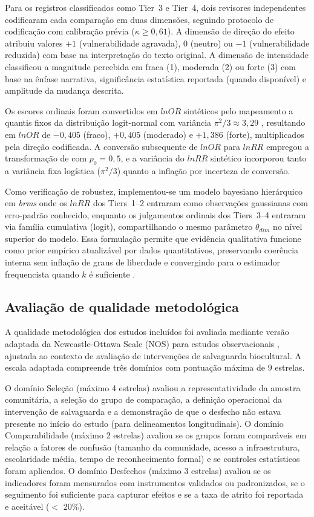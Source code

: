 Para os registros classificados como Tier~3 e Tier~4, dois revisores independentes codificaram cada comparação em duas dimensões, seguindo protocolo de codificação com calibração prévia ($\kappa \geq 0{,}61$). A dimensão de direção do efeito atribuiu valores $+1$ (vulnerabilidade agravada), $0$ (neutro) ou $-1$ (vulnerabilidade reduzida) com base na interpretação do texto original. A dimensão de intensidade classificou a magnitude percebida em fraca (1), moderada (2) ou forte (3) com base na ênfase narrativa, significância estatística reportada (quando disponível) e amplitude da mudança descrita.

Os escores ordinais foram convertidos em $lnOR$ sintéticos pelo mapeamento a quantis fixos da distribuição logit-normal com variância $\pi^2/3 \approx 3{,}29$ \cite{Hasselblad1995}, resultando em $lnOR$ de $-0{,}405$ (fraco), $+0{,}405$ (moderado) e $+1{,}386$ (forte), multiplicados pela direção codificada. A conversão subsequente de $lnOR$ para $lnRR$ empregou a transformação de  com $p_0 = 0{,}5$, e a variância do $lnRR$ sintético incorporou tanto a variância fixa logística ($\pi^2/3$) quanto a inflação por incerteza de conversão.

Como verificação de robustez, implementou-se um modelo bayesiano hierárquico em \textit{brms} \cite{Burkner2017} onde os $lnRR$ dos Tiers~1--2 entraram como observações gaussianas com erro-padrão conhecido, enquanto os julgamentos ordinais dos Tiers~3--4 entraram via família cumulativa (logit), compartilhando o mesmo parâmetro $\theta_{dim}$ no nível superior do modelo. Essa formulação permite que evidência qualitativa funcione como prior empírico atualizável por dados quantitativos, preservando coerência interna sem inflação de graus de liberdade e convergindo para o estimador frequencista quando $k$ é suficiente \cite{Rover2020}.

\subsection{Avaliação de qualidade metodológica}
\label{sec:nos_cap2}

A qualidade metodológica dos estudos incluídos foi avaliada mediante versão adaptada da Newcastle-Ottawa Scale (NOS) para estudos observacionais \cite{Wells2000}, ajustada ao contexto de avaliação de intervenções de salvaguarda biocultural. A escala adaptada compreende três domínios com pontuação máxima de 9 estrelas.

O domínio Seleção (máximo 4 estrelas) avaliou a representatividade da amostra comunitária, a seleção do grupo de comparação, a definição operacional da intervenção de salvaguarda e a demonstração de que o desfecho não estava presente no início do estudo (para delineamentos longitudinais). O domínio Comparabilidade (máximo 2 estrelas) avaliou se os grupos foram comparáveis em relação a fatores de confusão (tamanho da comunidade, acesso a infraestrutura, escolaridade média, tempo de reconhecimento formal) e se controles estatísticos foram aplicados. O domínio Desfechos (máximo 3 estrelas) avaliou se os indicadores foram mensurados com instrumentos validados ou padronizados, se o seguimento foi suficiente para capturar efeitos e se a taxa de atrito foi reportada e aceitável ($<$ 20\%).

